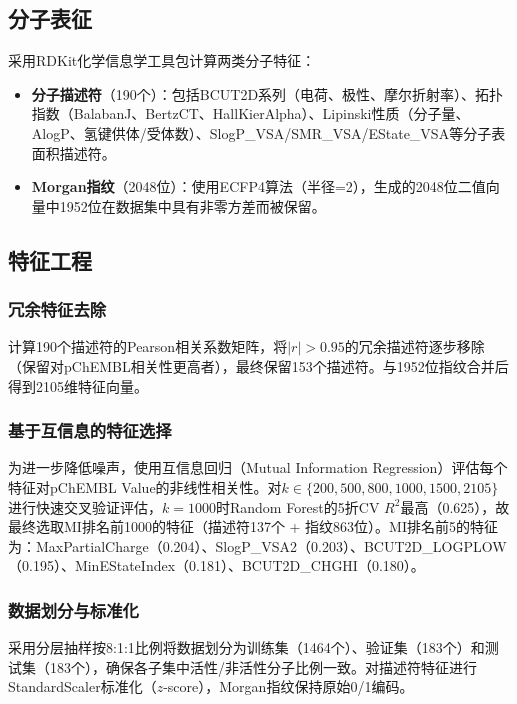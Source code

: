 \documentclass[12pt,a4paper]{article}
\begin{document}
\subsection{分子表征}

采用RDKit化学信息学工具包计算两类分子特征：

\begin{itemize}[leftmargin=2em]
    \item \textbf{分子描述符}（190个）：包括BCUT2D系列（电荷、极性、摩尔折射率）、拓扑指数（BalabanJ、BertzCT、HallKierAlpha）、Lipinski性质（分子量、AlogP、氢键供体/受体数）、SlogP\_VSA/SMR\_VSA/EState\_VSA等分子表面积描述符。
    \item \textbf{Morgan指纹}（2048位）：使用ECFP4算法（半径=2），生成的2048位二值向量中1952位在数据集中具有非零方差而被保留。
\end{itemize}

\subsection{特征工程}

\subsubsection{冗余特征去除}

计算190个描述符的Pearson相关系数矩阵，将$|r| > 0.95$的冗余描述符逐步移除（保留对pChEMBL相关性更高者），最终保留153个描述符。与1952位指纹合并后得到2105维特征向量。

\subsubsection{基于互信息的特征选择}

为进一步降低噪声，使用互信息回归（Mutual Information Regression）评估每个特征对pChEMBL Value的非线性相关性。对$k \in \{200, 500, 800, 1000, 1500, 2105\}$进行快速交叉验证评估，$k = 1000$时Random Forest的5折CV $R^2$最高（0.625），故最终选取MI排名前1000的特征（描述符137个 + 指纹863位）。MI排名前5的特征为：MaxPartialCharge（0.204）、SlogP\_VSA2（0.203）、BCUT2D\_LOGPLOW（0.195）、MinEStateIndex（0.181）、BCUT2D\_CHGHI（0.180）。

\subsubsection{数据划分与标准化}

采用分层抽样按8:1:1比例将数据划分为训练集（1464个）、验证集（183个）和测试集（183个），确保各子集中活性/非活性分子比例一致。对描述符特征进行StandardScaler标准化（$z$-score），Morgan指纹保持原始0/1编码。
\end{document}
